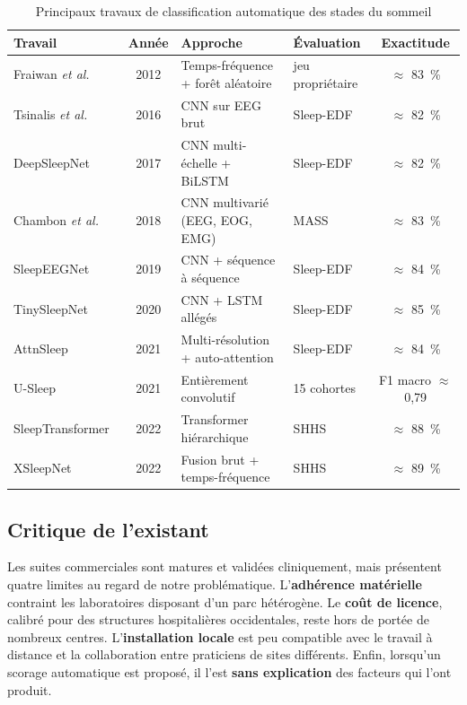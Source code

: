 \begin{table}[H]
\centering

\small
\begin{tabular}{@{}L{3.3cm}cL{4.4cm}L{2.2cm}c@{}}
\toprule
\textbf{Travail} & \textbf{Année} & \textbf{Approche} & \textbf{Évaluation} &
\textbf{Exactitude} \\
\midrule
Fraiwan \emph{et al.}~\cite{fraiwan2012} & 2012 & Temps-fréquence + forêt aléatoire &
jeu propriétaire & $\approx$ \SI{83}{\percent} \\
\addlinespace[2pt]
Tsinalis \emph{et al.}~\cite{tsinalis2016} & 2016 & CNN sur EEG brut & Sleep-EDF &
$\approx$ \SI{82}{\percent} \\
\addlinespace[2pt]
DeepSleepNet~\cite{supratak2017} & 2017 & CNN multi-échelle + BiLSTM & Sleep-EDF &
$\approx$ \SI{82}{\percent} \\
\addlinespace[2pt]
Chambon \emph{et al.}~\cite{chambon2018} & 2018 & CNN multivarié (EEG, EOG, EMG) &
MASS & $\approx$ \SI{83}{\percent} \\
\addlinespace[2pt]
SleepEEGNet~\cite{mousavi2019} & 2019 & CNN + séquence à séquence & Sleep-EDF &
$\approx$ \SI{84}{\percent} \\
\addlinespace[2pt]
TinySleepNet~\cite{supratak2020} & 2020 & CNN + LSTM allégés & Sleep-EDF &
$\approx$ \SI{85}{\percent} \\
\addlinespace[2pt]
AttnSleep~\cite{eldele2021} & 2021 & Multi-résolution + auto-attention & Sleep-EDF &
$\approx$ \SI{84}{\percent} \\
\addlinespace[2pt]
U-Sleep~\cite{perslev2021} & 2021 & Entièrement convolutif & 15 cohortes &
F1 macro $\approx$ 0,79 \\
\addlinespace[2pt]
SleepTransformer~\cite{phan2022} & 2022 & Transformer hiérarchique & SHHS &
$\approx$ \SI{88}{\percent} \\
\addlinespace[2pt]
XSleepNet~\cite{phan2021} & 2022 & Fusion brut + temps-fréquence & SHHS &
$\approx$ \SI{89}{\percent} \\
\bottomrule
\end{tabular}
\caption{Principaux travaux de classification automatique des stades du sommeil}
\label{tab:etat-art-staging}
\end{table}

\subsection{Critique de l'existant}

Les suites commerciales sont matures et validées cliniquement, mais présentent quatre
limites au regard de notre problématique. L'\textbf{adhérence matérielle} contraint les
laboratoires disposant d'un parc hétérogène. Le \textbf{coût de licence}, calibré pour
des structures hospitalières occidentales, reste hors de portée de nombreux centres.
L'\textbf{installation locale} est peu compatible avec le travail à distance et la
collaboration entre praticiens de sites différents. Enfin, lorsqu'un scorage
automatique est proposé, il l'est \textbf{sans explication} des facteurs qui l'ont
produit.

